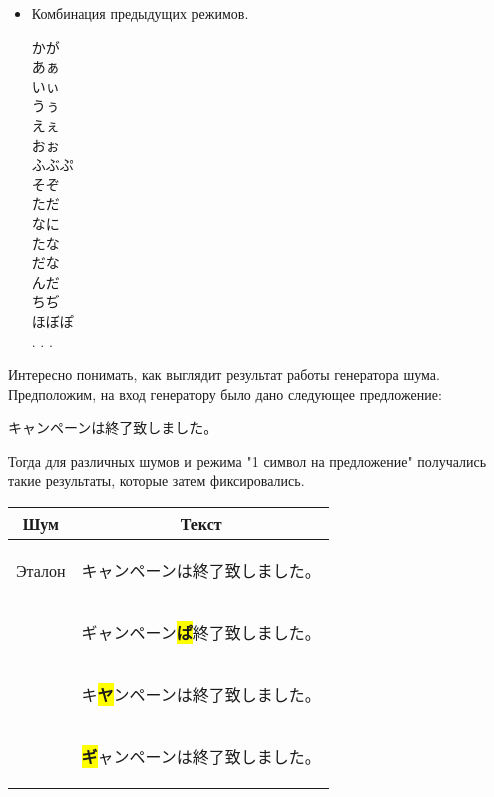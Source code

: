 \begin{itemize}
	\item[\MX] Комбинация предыдущих режимов.
		\begin{multicols}{3}
		\begin{CJK}{UTF8}{min}
			かが \\
			あぁ \\
			いぃ\\
			うぅ\\
			えぇ\\
			おぉ\\
			ふぶぷ   \\
			そぞ \\
			ただ \\
			なに \\
			たな \\
			だな \\
			んだ \\
			ちぢ \\
			ほぼぽ \\
		. . . \end{CJK}
	\end{multicols}
	
\end{itemize}

Интересно понимать, как выглядит результат работы генератора шума.
Предположим, на вход генератору было дано следующее предложение:

\begin{CJK}{UTF8}{min}キャンペーンは終了致しました。 \end{CJK} 

Тогда для различных шумов и режима "1 символ на предложение" получались такие результаты, которые затем фиксировались.

\begin{tabular}{|c|c|} \hline
	Шум 	& Текст\\ \hline
	Эталон 	& \begin{CJK}{UTF8}{min}キャンペーンは終了致しました。 \end{CJK} \\
	\KG	&  \begin{CJK}{UTF8}{min}ギャンペーン\colorbox{yellow}{\textbf{ぱ}}終了致しました。 \end{CJK} \\
	\BS &  \begin{CJK}{UTF8}{min}キ\colorbox{yellow}{\textbf{ヤ}}ンペーンは終了致しました。 \end{CJK} \\
	\MX 	&  \begin{CJK}{UTF8}{min}\colorbox{yellow}{\textbf{ギ}}ャンペーンは終了致しました。 \end{CJK}  \\ \hline
\end{tabular}

